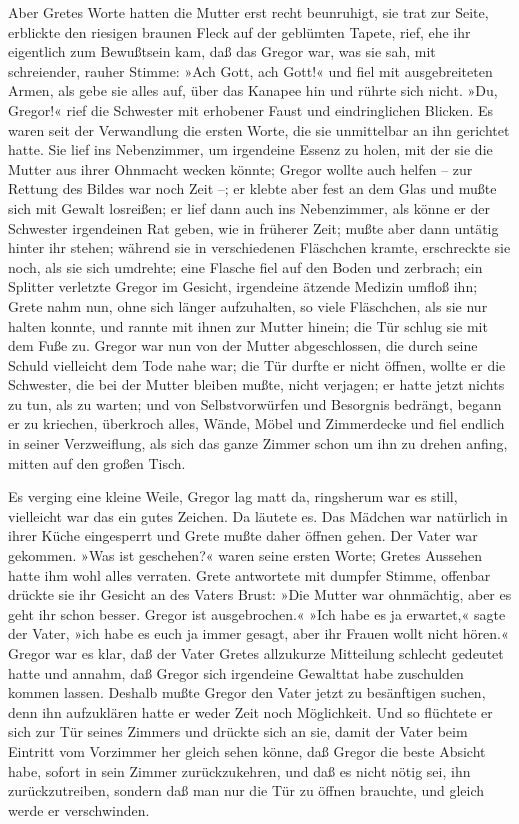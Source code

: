 Aber Gretes Worte hatten die Mutter erst recht beunruhigt, sie trat zur
Seite, erblickte den riesigen braunen Fleck auf der geblümten Tapete,
rief, ehe ihr eigentlich zum Bewußtsein kam, daß das Gregor war, was sie
sah, mit schreiender, rauher Stimme: »Ach Gott, ach Gott!« und fiel mit
ausgebreiteten Armen, als gebe sie alles auf, über das Kanapee hin und
rührte sich nicht. »Du, Gregor!« rief die Schwester mit erhobener Faust
und eindringlichen Blicken. Es waren seit der Verwandlung die ersten
Worte, die sie unmittelbar an ihn gerichtet hatte. Sie lief ins
Nebenzimmer, um irgendeine Essenz zu holen, mit der sie die Mutter aus
ihrer Ohnmacht wecken könnte; Gregor wollte auch helfen -- zur Rettung
des Bildes war noch Zeit --; er klebte aber fest an dem Glas und mußte
sich mit Gewalt losreißen; er lief dann auch ins Nebenzimmer, als könne
er der Schwester irgendeinen Rat geben, wie in früherer Zeit; mußte aber
dann untätig hinter ihr stehen; während sie in verschiedenen Fläschchen
kramte, erschreckte sie noch, als sie sich umdrehte; eine Flasche fiel
auf den Boden und zerbrach; ein Splitter verletzte Gregor im Gesicht,
irgendeine ätzende Medizin umfloß ihn; Grete nahm nun, ohne sich länger
aufzuhalten, so viele Fläschchen, als sie nur halten konnte, und rannte
mit ihnen zur Mutter hinein; die Tür schlug sie mit dem Fuße zu. Gregor
war nun von der Mutter abgeschlossen, die durch seine Schuld vielleicht
dem Tode nahe war; die Tür durfte er nicht öffnen, wollte er die
Schwester, die bei der Mutter bleiben mußte, nicht verjagen; er hatte
jetzt nichts zu tun, als zu warten; und von Selbstvorwürfen und
Besorgnis bedrängt, begann er zu kriechen, überkroch alles, Wände,
Möbel und Zimmerdecke und fiel endlich in seiner Verzweiflung, als sich
das ganze Zimmer schon um ihn zu drehen anfing, mitten auf den großen
Tisch.

Es verging eine kleine Weile, Gregor lag matt da, ringsherum war es
still, vielleicht war das ein gutes Zeichen. Da läutete es. Das Mädchen
war natürlich in ihrer Küche eingesperrt und Grete mußte daher öffnen
gehen. Der Vater war gekommen. »Was ist geschehen?« waren seine ersten
Worte; Gretes Aussehen hatte ihm wohl alles verraten. Grete antwortete
mit dumpfer Stimme, offenbar drückte sie ihr Gesicht an des Vaters
Brust: »Die Mutter war ohnmächtig, aber es geht ihr schon besser. Gregor
ist ausgebrochen.« »Ich habe es ja erwartet,« sagte der Vater, »ich habe
es euch ja immer gesagt, aber ihr Frauen wollt nicht hören.« Gregor war
es klar, daß der Vater Gretes allzukurze Mitteilung schlecht gedeutet
hatte und annahm, daß Gregor sich irgendeine Gewalttat habe zuschulden
kommen lassen. Deshalb mußte Gregor den Vater jetzt zu besänftigen
suchen, denn ihn aufzuklären hatte er weder Zeit noch Möglichkeit. Und
so flüchtete er sich zur Tür seines Zimmers und drückte sich an sie,
damit der Vater beim Eintritt vom Vorzimmer her gleich sehen könne, daß
Gregor die beste Absicht habe, sofort in sein Zimmer zurückzukehren, und
daß es nicht nötig sei, ihn zurückzutreiben, sondern daß man nur die Tür
zu öffnen brauchte, und gleich werde er verschwinden.

